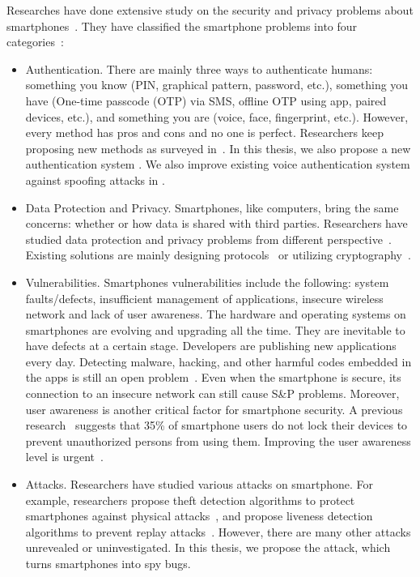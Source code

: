 Researches have done extensive study on the security and privacy problems about smartphones~\cite{ali2019security,zaidi2016survey,chin2012measuring,khan2015survey}. They have classified the smartphone problems into four categories~\cite{zaidi2016survey}:

\begin{itemize}
	\item Authentication. There are mainly three ways to authenticate humans: something you know (PIN, graphical pattern, password, etc.), something you have (One-time passcode (OTP) via SMS, offline OTP using app, paired devices, etc.), and something you are (voice, face, fingerprint, etc.). However, every method has pros  and cons and no one is perfect. Researchers keep proposing new methods as surveyed in~\cite{teh2016survey,spolaor2016biometric,mahfouz2017survey,vongsingthong2015survey,gupta2018demystifying}.  In this thesis, we also propose a new authentication system {\uu}. We also improve existing voice authentication system against spoofing attacks in {\mv}.
	
	\item  Data Protection and Privacy. Smartphones, like computers, bring the same concerns: whether or how data is shared with third parties. Researchers have studied data protection and privacy problems from different perspective~\cite{muslukhov2012understanding,boyles2012privacy,wang2015know}. Existing solutions are mainly designing protocols~\cite{zegers2015lightweight,urien2013framework} or utilizing cryptography~\cite{patel2016integrated,han2016enhancing}.
	
	\item Vulnerabilities. Smartphones vulnerabilities include the following: system faults/defects, insufficient management of applications, insecure wireless network and lack of user awareness. The hardware and operating systems on smartphones are evolving and upgrading all the time. They are inevitable to have defects at a certain stage. Developers are publishing new applications every day. Detecting malware, hacking, and other harmful codes embedded in the apps is still an open problem~\cite{idrees2017pindroid}. Even when the smartphone is secure, its connection to an insecure network can still cause S\&P problems. Moreover, user awareness is another critical factor for smartphone security. A previous research~\cite{van2013modifying} suggests that 35\% of smartphone users do not lock their devices to prevent unauthorized persons from using them. Improving the user awareness level is urgent~\cite{koyuncu2019security}.
	
	\item Attacks. Researchers have studied various attacks on smartphone. For example, researchers propose theft detection algorithms to protect smartphones against physical attacks~\cite{chang2016smartdog}, and propose liveness detection algorithms to prevent replay attacks~\cite{zhang2016voicelive}.  However, there are many other attacks unrevealed or uninvestigated.  In this thesis, we propose the {\attackName} attack, which turns smartphones into spy bugs. 
\end{itemize}




